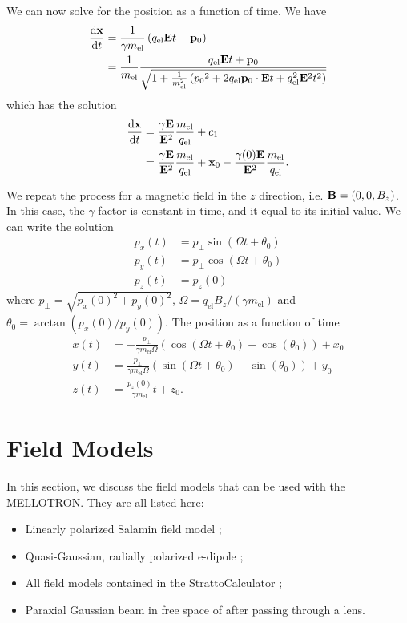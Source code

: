 \documentclass[10pt,letterpaper,extrafontsizes, onecolumn,openright]{memoir}
\begin{document}
We can now solve for the position as a function of time. We have
	\begin{align}
		\dv{\vb{x}}{t} &= \frac{1}{\gamma m_\text{el}}\left(q_\text{el}\vb{E}t+\vb{p}_0\right) \\
		               &= \frac{1}{m_\text{el}}\frac{q_\text{el}\vb{E}t+\vb{p}_0}{\sqrt{1+\frac{1}{m_\text{el}^2}\left({p_0}^2+2q_\text{el}\vb{p}_0\cdot\vb{E}t+q_\text{el}^2\vb{E}^2t^2\right)}}
	\end{align}
which has the solution
	\begin{align}
		\dv{\vb{x}}{t} &= \frac{\gamma\vb{E}}{\vb{E}^2}\frac{m_\text{el}}{q_\text{el}}+c_1 \\
		               &= \frac{\gamma\vb{E}}{\vb{E}^2}\frac{m_\text{el}}{q_\text{el}}
		                 +\vb{x}_0-\frac{\gamma(0)\vb{E}}{\vb{E}^2}\frac{m_\text{el}}{q_\text{el}}.
  \end{align}

We repeat the process for a magnetic field in the $z$ direction, i.e.
$\vb{B}=(0,0,B_z)$. In this case, the $\gamma$ factor is constant in time,
and it equal to its initial value. We can write the solution
	\begin{align}
		p_x(t) &= p_\perp \sin(\Omega t + \theta_0) \\
		p_y(t) &= p_\perp \cos(\Omega t + \theta_0) \\
		p_z(t) &= p_z(0)
	\end{align}
where $p_\perp=\sqrt{p_x(0)^2+p_y(0)^2}$, $\Omega=q_\text{el}B_z/(\gamma m_\text{el})$
and $\theta_0=\arctan(p_x(0)/p_y(0))$. The position as a function of time
	\begin{align}
		x(t)  &= -\frac{p_\perp}{\gamma m_\text{el}\Omega}\left(\cos(\Omega t+\theta_0)-\cos(\theta_0)\right)+x_0 \\
		y(t)  &=  \frac{p_\perp}{\gamma m_\text{el}\Omega}\left(\sin(\Omega t+\theta_0)-\sin(\theta_0)\right)+y_0 \\
		z(t)  &= \frac{p_z(0)}{\gamma m_\text{el}}t+z_0.
	\end{align}

\chapter{Field Models}

In this section, we discuss the field models that can be used with the MELLOTRON.
They are all listed here:
	\begin{itemize}
			\item Linearly polarized Salamin field model \cite{SAL2015b};
			\item Quasi-Gaussian, radially polarized e-dipole \cite{GON2012};
			\item All field models contained in the StrattoCalculator \cite{DUM2017};
			\item Paraxial Gaussian beam in free space of after passing through a lens.
	\end{itemize}
\end{document}
